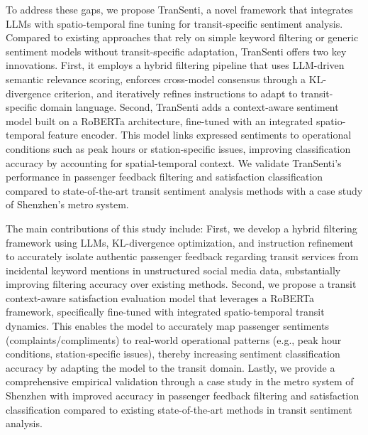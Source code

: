 \documentclass[a4paper,fleqn,12pt]{cas-sc}
\begin{document}
To address these gaps, we propose TranSenti, a novel framework that integrates LLMs with spatio-temporal fine tuning for transit-specific sentiment analysis. Compared to existing approaches that rely on simple keyword filtering or generic sentiment models without transit-specific adaptation, TranSenti offers two key innovations. First, it employs a hybrid filtering pipeline that uses LLM-driven semantic relevance scoring, enforces cross-model consensus through a KL-divergence criterion, and iteratively refines instructions to adapt to transit-specific domain language. Second, TranSenti adds a context-aware sentiment model built on a RoBERTa architecture, fine-tuned with an integrated spatio-temporal feature encoder. This model links expressed sentiments to operational conditions such as peak hours or station-specific issues, improving classification accuracy by accounting for spatial-temporal context. We validate TranSenti’s performance in passenger feedback filtering and satisfaction classification compared to state-of-the-art transit sentiment analysis methods with a case study of Shenzhen’s metro system. 

The main contributions of this study include: First, we develop a hybrid filtering framework using LLMs, KL-divergence optimization, and instruction refinement to accurately isolate authentic passenger feedback regarding transit services from incidental keyword mentions in unstructured social media data, substantially improving filtering accuracy over existing methods. Second, we propose a transit context-aware satisfaction evaluation model that leverages a RoBERTa framework, specifically fine-tuned with integrated spatio-temporal transit dynamics. This enables the model to accurately map passenger sentiments (complaints/compliments) to real-world operational patterns (e.g., peak hour conditions, station-specific issues), thereby increasing sentiment classification accuracy by adapting the model to the transit domain. Lastly, we provide a comprehensive empirical validation through a case study in the metro system of Shenzhen with improved accuracy in passenger feedback filtering and satisfaction classification compared to existing state-of-the-art methods in transit sentiment analysis.
\end{document}
